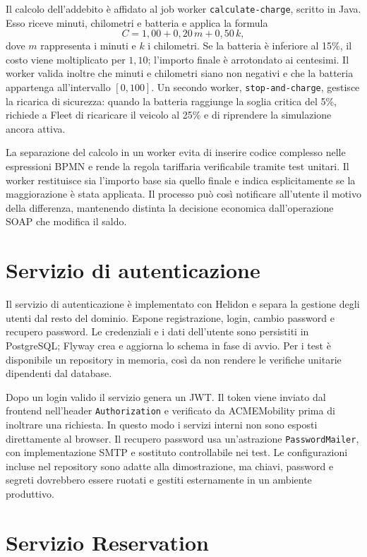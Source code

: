 \documentclass[12pt,a4paper,twoside]{report}
\newcommand{\code}[1]{\texttt{#1}}
\begin{document}
Il calcolo dell'addebito è affidato al job worker
\code{calculate-charge}, scritto in Java. Esso riceve minuti, chilometri e
batteria e applica la formula
\[
  C = 1{,}00 + 0{,}20\,m + 0{,}50\,k,
\]
dove $m$ rappresenta i minuti e $k$ i chilometri. Se la batteria è inferiore
al 15\%, il costo viene moltiplicato per $1{,}10$; l'importo finale è
arrotondato ai centesimi. Il worker valida inoltre che minuti e chilometri
siano non negativi e che la batteria appartenga all'intervallo $[0,100]$.
Un secondo worker, \code{stop-and-charge}, gestisce la ricarica di sicurezza:
quando la batteria raggiunge la soglia critica del 5\%, richiede a Fleet di
ricaricare il veicolo al 25\% e di riprendere la simulazione ancora attiva.

La separazione del calcolo in un worker evita di inserire codice complesso
nelle espressioni BPMN e rende la regola tariffaria verificabile tramite test
unitari. Il worker restituisce sia l'importo base sia quello finale e indica
esplicitamente se la maggiorazione è stata applicata. Il processo può così
notificare all'utente il motivo della differenza, mantenendo distinta la
decisione economica dall'operazione SOAP che modifica il saldo.

\section{Servizio di autenticazione}

Il servizio di autenticazione è implementato con Helidon e separa la gestione
degli utenti dal resto del dominio. Espone registrazione, login, cambio
password e recupero password. Le credenziali e i dati dell'utente sono
persistiti in PostgreSQL; Flyway crea e aggiorna lo schema in fase di avvio.
Per i test è disponibile un repository in memoria, così da non rendere le
verifiche unitarie dipendenti dal database.

Dopo un login valido il servizio genera un JWT. Il token viene inviato dal
frontend nell'header \code{Authorization} e verificato da ACMEMobility prima
di inoltrare una richiesta. In questo modo i servizi interni non sono esposti
direttamente al browser. Il recupero password usa un'astrazione
\code{PasswordMailer}, con implementazione SMTP e sostituto controllabile nei
test. Le configurazioni incluse nel repository sono adatte alla
dimostrazione, ma chiavi, password e segreti dovrebbero essere ruotati e
gestiti esternamente in un ambiente produttivo.

\section{Servizio Reservation}
\end{document}
